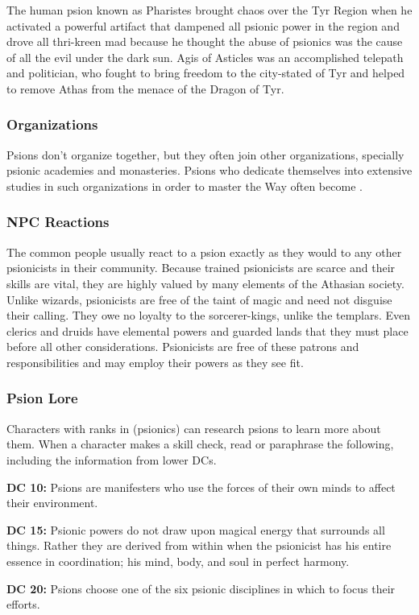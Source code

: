 The human psion known as Pharistes brought chaos over the Tyr Region when he activated a powerful artifact that dampened all psionic power in the region and drove all thri-kreen mad because he thought the abuse of psionics was the cause of all the evil under the dark sun. Agis of Asticles was an accomplished telepath and politician, who fought to bring freedom to the city-stated of Tyr and helped to remove Athas from the menace of the Dragon of Tyr.

\subsubsection{Organizations}

Psions don't organize together, but they often join other organizations, specially psionic academies and monasteries. Psions who dedicate themselves into extensive studies in such organizations in order to master the Way often become .

\subsubsection{NPC Reactions}

The common people usually react to a psion exactly as they would to any other psionicists in their community. Because trained psionicists are scarce and their skills are vital, they are highly valued by many elements of the Athasian society. Unlike wizards, psionicists are free of the taint of magic and need not disguise their calling. They owe no loyalty to the sorcerer-kings, unlike the templars. Even clerics and druids have elemental powers and guarded lands that they must place before all other considerations. Psionicists are free of these patrons and responsibilities and may employ their powers as they see fit.

\subsubsection{Psion Lore}

Characters with ranks in  (psionics) can research psions to learn more about them. When a character makes a skill check, read or paraphrase the following, including the information from lower DCs.

\textbf{DC 10:} Psions are manifesters who use the forces of their own minds to affect their environment.

\textbf{DC 15:} Psionic powers do not draw upon magical energy that surrounds all things. Rather they are derived from within when the psionicist has his entire essence in coordination; his mind, body, and soul in perfect harmony.

\textbf{DC 20:} Psions choose one of the six psionic disciplines in which to focus their efforts.

